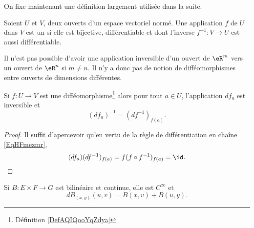 On fixe maintenant une définition largement utilisée dans la suite. 
\begin{definition}      \label{DefAQIQooYqZdya}
	 Soient $U$ et $V$, deux ouverts d'un espace vectoriel normé. Une application $f$ de $U$ dans $V$ est un  si elle est bijective, différentiable et dont l'inverse $f^{-1}:V\to U $ est aussi différentiable. 
\end{definition}

\begin{remark}
	Il n'est pas possible d'avoir une application inversible d'un ouvert de $\eR^m$ vers un ouvert de $\eR^n$ si $m\neq n$. Il n'y a donc pas de notion de difféomorphismes entre ouverts de dimensions différentes.
\end{remark}

\begin{lemma}       \label{LemooTJSZooWkuSzv}
    Si \( f\colon U\to V\) est une difféomorphisme\footnote{Définition \ref{DefAQIQooYqZdya}} alors pour tout \( a\in U\), l'application \( df_a\) est inversible et
    \begin{equation}
        (df_a)^{-1}=(df^{-1})_{f(a)}.
    \end{equation}
\end{lemma}

\begin{proof}
    Il suffit d'apercevoir qu'en vertu de la règle de différentiation en chaîne \ref{EqHFmezmr},
    \begin{equation}
        (df_a)(df^{-1})_{f(a)}=f(f\circ f^{-1})_{f(a)}=\id.
    \end{equation}
\end{proof}

\begin{lemma}\label{LemFRdNDCd}
    Si \( B\colon E\times F\to G\) est bilinéaire et continue, elle est \(  C^{\infty}\) et
    \begin{equation}    \label{EqXYJgDBt}
        dB_{(x,y)}(u,v)=B(x,v)+B(u,y).
    \end{equation}
\end{lemma}


